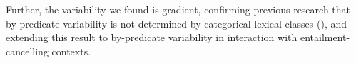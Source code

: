 \documentclass[12pt, a4paper]{article}
\begin{document}
	\noindent Further, the variability we found is gradient, confirming previous research that by-predicate variability is not determined by categorical lexical classes (\citealt{tonhauser_how_2018,degen_are_2022}), and extending this result to by-predicate variability in interaction with entailment-cancelling contexts.\\
	


	
\end{document}
